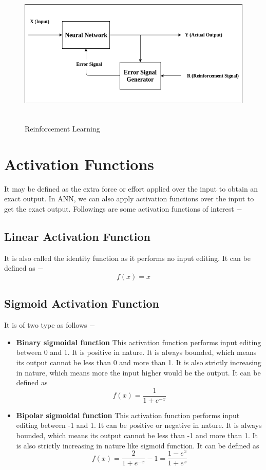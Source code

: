 \documentclass{report}
\begin{document}
\begin{figure}[htbp]
\centering
\includegraphics[height=7cm]{Pictures/Reinforcement_Learning.png}
\caption{Reinforcement Learning}
\label{}
\end{figure}


\section{Activation Functions}
It may be defined as the extra force or effort applied over the input to obtain an exact output. In ANN, we can also apply activation functions over the input to get the exact output. Followings are some activation functions of interest −

\subsection{Linear Activation Function}
It is also called the identity function as it performs no input editing. It can be defined as −
\[f(x) = x\]

\subsection{Sigmoid Activation Function}
It is of two type as follows −

\begin{itemize}
\item \textbf{Binary sigmoidal function} This activation function performs input editing between 0 and 1. It is positive in nature. It is always bounded, which means its output cannot be less than 0 and more than 1. It is also strictly increasing in nature, which means more the input higher would be the output. It can be defined as
\[f(x) = \frac{1}{1+e^{-x}}\]

\item \textbf{Bipolar sigmoidal function} This activation function performs input editing between -1 and 1. It can be positive or negative in nature. It is always bounded, which means its output cannot be less than -1 and more than 1. It is also strictly increasing in nature like sigmoid function. It can be defined as\[f(x) = \frac{2}{1+e^{-x}}-1 = \frac{1-e^{x}}{1+e^{x}}\]


\end{itemize}
\end{document}
